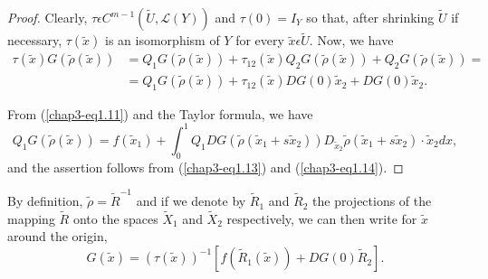 \begin{proof}
Clearly, $\tau \epsilon C^{m-1} (\widetilde{U}, \mathscr{L}(Y))$ and
$\tau(0) = I_{Y}$ so that, after shrinking $\widetilde{U}$ if
necessary, $\tau(\widetilde{x})$ is an isomorphism of  $Y$ for every
$\widetilde{x} \epsilon \widetilde{U}$. Now, we have
\begin{align*}
\tau(\widetilde{x}) G(\widetilde{\rho}(\widetilde{x})) & =
Q_{1}G(\widetilde{\rho}(\widetilde{x})) + \tau_{12}(\widetilde{x})
Q_{2}G(\widetilde{\rho}(\widetilde{x})) +
Q_{2}G(\widetilde{\rho}(\widetilde{x})) =
\tag{1.14}\label{chap3-eq1.14}\\
& = Q_{1}G(\widetilde{\rho}(\widetilde{x})) + \tau_{12}(\widetilde{x})
DG(0) \widetilde{x}_{2} + DG(0) \widetilde{x}_{2}.
\end{align*}

From (\ref{chap3-eq1.11}) and the Taylor formula, we have
$$
Q_{1}G(\widetilde{\rho}(\widetilde{x})) = f(\widetilde{x}_{1}) +
\int_{0}^{1} Q_{1}DG(\widetilde{\rho}(\widetilde{x}_{1} +
s\widetilde{x}_{2})) D_{\widetilde{x}_{2}}
\widetilde{\rho}(\widetilde{x}_{1} + s\widetilde{x}_{2}) \cdot
\widetilde{x}_{2} dx,
$$
and the assertion follows from (\ref{chap3-eq1.13}) and
(\ref{chap3-eq1.14}).
\end{proof}

By definition, $\widetilde{\rho} = \widetilde{R}^{-1}$ and if we
denote by $\widetilde{R}_{1}$ and $\widetilde{R}_{2}$ the projections
of the mapping $\widetilde{R}$ onto the spaces $\widetilde{X}_{1}$ and
$\widetilde{X}_{2}$ respectively, we can then write for
$\widetilde{x}$ around the origin,
\begin{equation*}
G(\widetilde{x}) = (\tau(\widetilde{x}))^{-1}
\left[f(\widetilde{R}_{1}(\widetilde{x})) + DG(0) \widetilde{R}_{2}\right].\tag{1.15}\label{chap3-eq1.15}
\end{equation*}

